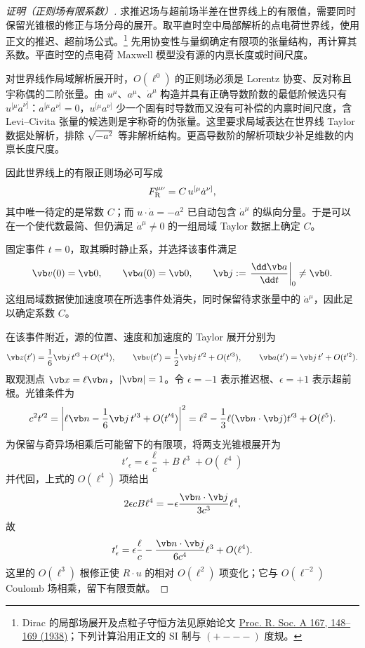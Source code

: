 \begin{proof}[证明（正则场有限系数）]
求推迟场与超前场半差在世界线上的有限值，需要同时保留光锥根的修正与场分母的展开。取平直时空中局部解析的点电荷世界线，使用正文的推迟、超前场公式。\footnote{Dirac 的局部场展开及点粒子守恒方法见原始论文 \href{https://doi.org/10.1098/rspa.1938.0124}{Proc. R. Soc. A 167, 148--169 (1938)}；下列计算沿用正文的 SI 制与 $(+---)$ 度规。}
先用协变性与量纲确定有限项的张量结构，再计算其系数。平直时空的点电荷 Maxwell 模型没有源的内禀长度或时间尺度。

对世界线作局域解析展开时，\(O(\ell^0)\) 的正则场必须是 Lorentz 协变、反对称且宇称偶的二阶张量。由 \(u^\mu\)、\(a^\mu\)、\(\dot a^\mu\) 构造并具有正确导数阶数的最低阶候选只有 \(u^{[\mu}\dot a^{\nu]}\)：\(a^{[\mu}a^{\nu]}=0\)，\(u^{[\mu}a^{\nu]}\) 少一个固有时导数而又没有可补偿的内禀时间尺度，含 Levi--Civita 张量的候选则是宇称奇的伪张量。这里要求局域表达在世界线 Taylor 数据处解析，排除 $\sqrt{-a^2}$ 等非解析结构。更高导数阶的解析项缺少补足维数的内禀长度尺度。

因此世界线上的有限正则场必可写成
\[
 F_{\rm R}^{\mu\nu}=C\,u^{[\mu}\dot a^{\nu]},
\]
其中唯一待定的是常数 \(C\)；而 \(u\cdot\dot a=-a^2\) 已自动包含 \(\dot a^\mu\) 的纵向分量。于是可以在一个使代数最简、但仍满足 \(\dot a^\mu\neq0\) 的一组局域 Taylor 数据上确定 \(C\)。

固定事件 \(t=0\)，取其瞬时静止系，并选择该事件满足
\[
 \vb v(0)=\vb0,
 \qquad
 \vb a(0)=\vb0,
 \qquad
 \vb j:=\left.\frac{\dd\vb a}{\dd t}\right|_{0}\neq\vb0.
\]
这组局域数据使加速度项在所选事件处消失，同时保留待求张量中的 $\dot a^\mu$，因此足以确定系数 $C$。

在该事件附近，源的位置、速度和加速度的 Taylor 展开分别为
\[
 \vb z(t')=\frac16\vb j\,t'^3+O(t'^4),
 \qquad
 \vb v(t')=\frac12\vb j\,t'^2+O(t'^3),
 \qquad
 \vb a(t')=\vb j\,t'+O(t'^2).
\]
取观测点 \(\vb x=\ell\vb n\)，\(|\vb n|=1\)。令 \(\epsilon=-1\) 表示推迟根、\(\epsilon=+1\) 表示超前根。光锥条件为
\[
 c^2t'^2
 =\left|\ell\vb n-\frac16\vb j\,t'^3+O(t'^4)\right|^2
 =\ell^2-\frac13\ell(\vb n\cdot\vb j)t'^3+O(\ell^5).
\]
为保留与奇异场相乘后可能留下的有限项，将两支光锥根展开为
\[
 t'_{\epsilon}=\epsilon\frac{\ell}{c}+B\ell^3+O(\ell^4)
\]
并代回，上式的 \(O(\ell^4)\) 项给出
\[
 2\epsilon cB\ell^4
 =-\epsilon\frac{\vb n\cdot\vb j}{3c^3}\ell^4,
\]
故
\begin{equation*}
 t'_{\epsilon}
 =\epsilon\frac{\ell}{c}
 -\frac{\vb n\cdot\vb j}{6c^4}\ell^3
 +O(\ell^4).
\end{equation*}
这里的 \(O(\ell^3)\) 根修正使 $R\cdot u$ 的相对 $O(\ell^2)$ 项变化；它与 $O(\ell^{-2})$ Coulomb 场相乘，留下有限贡献。


\end{proof}
